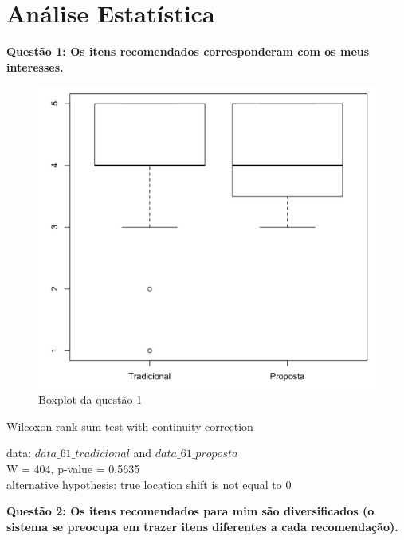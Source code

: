 \chapter{Análise Estatística }\label{ape:intervencoes}

\textbf{Questão 1: Os itens recomendados corresponderam com os meus interesses.}

\begin{figure}[htb]
  \caption{\label{fig:questao1-boxplot}Boxplot da questão 1}
  \begin{center}
      \includegraphics[scale=0.6]{./Figuras/questao1-boxplot.png}
  \end{center}
\end{figure}

Wilcoxon rank sum test with continuity correction

data:  $data\_61\_tradicional$ and $data\_61\_proposta$\\
W = 404, p-value = 0.5635\\
alternative hypothesis: true location shift is not equal to 0


\newpage\newpage
\textbf{Questão 2: Os itens recomendados para mim são diversificados (o sistema se preocupa em trazer itens diferentes a cada recomendação).}

